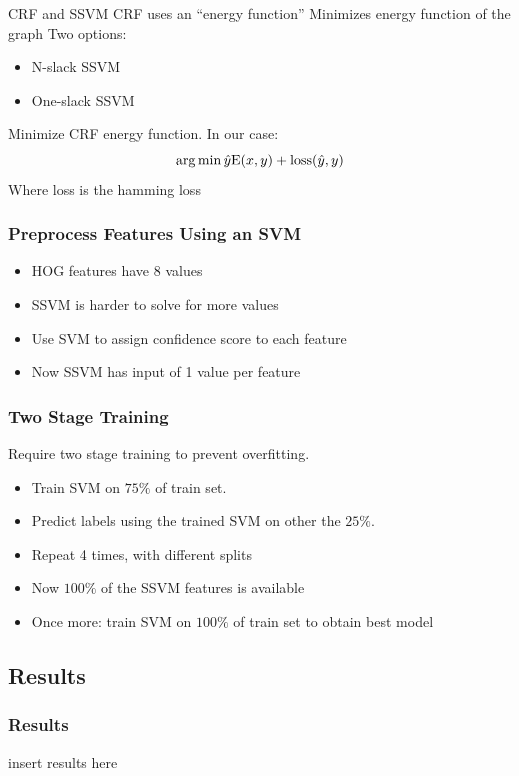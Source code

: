 \begin{frame}{CRF and SSVM}
	CRF uses an ``energy function''
Minimizes energy function of the graph
Two options:
\begin{itemize}
	\item N-slack SSVM
	\item One-slack SSVM
\end{itemize}
Minimize CRF energy function. In our case:
$$\operatorname*{arg\,min} \hat{y} \text{E}(x, y) + \text{loss}(\hat{y}, y) $$
Where loss is the hamming loss


\end{frame}

\begin{frame}
\frametitle{Preprocess Features Using an SVM}
\begin{itemize}
\item HOG features have 8 values
\item SSVM is harder to solve for more values
\item Use SVM to assign confidence score to each feature
\item Now SSVM has input of 1 value per feature
\end{itemize}
\end{frame}

\begin{frame}
\frametitle{Two Stage Training}
Require two stage training to prevent overfitting.
\begin{itemize}
\item Train SVM on $75\%$ of train set.
\item Predict labels using the trained SVM on other the $25\%$.
\item Repeat 4 times, with different splits
\item Now $100\%$ of the SSVM features is available
\item Once more: train SVM on $100\%$ of train set to obtain best model
\end{itemize}
\end{frame}

\subsection{Results}

\begin{frame}
\frametitle{Results}
insert results here
\end{frame}
